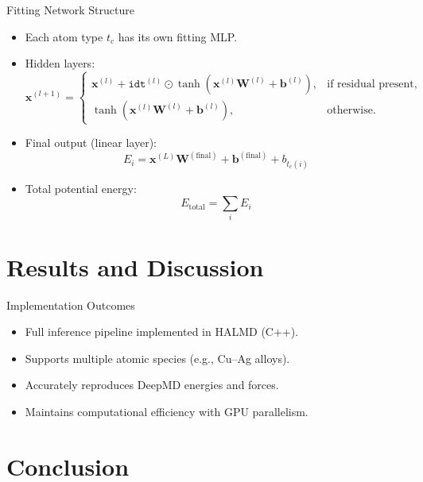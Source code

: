 \documentclass[aspectratio=169]{beamer}
\begin{document}
\begin{frame}{Fitting Network Structure}
\begin{itemize}
    \item Each atom type $t_c$ has its own fitting MLP.
    \item Hidden layers:
    \[
    \mathbf{x}^{(l+1)} =
    \begin{cases}
        \mathbf{x}^{(l)} + \texttt{idt}^{(l)} \odot \tanh(\mathbf{x}^{(l)}\mathbf{W}^{(l)}+\mathbf{b}^{(l)}), & \text{if residual present}, \\[5pt]
        \tanh(\mathbf{x}^{(l)}\mathbf{W}^{(l)}+\mathbf{b}^{(l)}), & \text{otherwise.}
    \end{cases}
    \]
    \item Final output (linear layer):
    \[
    E_i = \mathbf{x}^{(L)}\mathbf{W}^{(\text{final})} + \mathbf{b}^{(\text{final})} + b_{t_c(i)}
    \]
    \item Total potential energy:
    \[
    E_{\text{total}} = \sum_i E_i
    \]
\end{itemize}
\end{frame}

\section{Results and Discussion}

\begin{frame}{Implementation Outcomes}
\begin{itemize}
    \item Full inference pipeline implemented in HALMD (C++).
    \item Supports multiple atomic species (e.g., Cu–Ag alloys).
    \item Accurately reproduces DeepMD energies and forces.
    \item Maintains computational efficiency with GPU parallelism.
\end{itemize}
\begin{center}
\end{center}
\end{frame}

\section{Conclusion}
\end{document}
